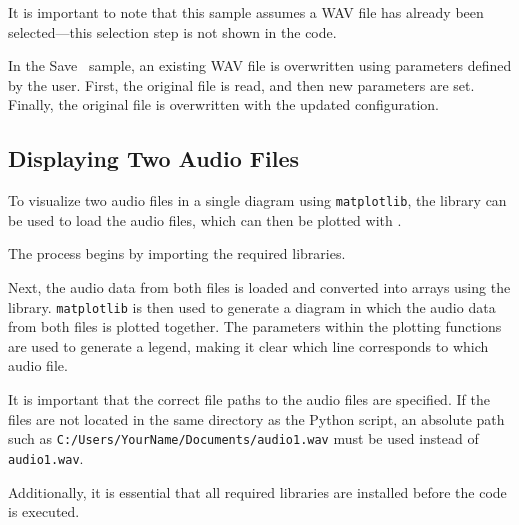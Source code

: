 It is important to note that this sample assumes a WAV file has already been selected—this selection step is not shown in the code.

\begin{code}[!htp]
	\caption{Program to read a WAV file and write its contents to a new WAV file using the wave module} 
	\label{Code:Python:File:copyWavFile}
\end{code}    

In the \glqq Save\grqq~ sample, an existing WAV file is overwritten using parameters defined by the user.  
First, the original file is read, and then new parameters are set.  
Finally, the original file is overwritten with the updated configuration.

\subsection{Displaying Two Audio Files}

To visualize two audio files in a single diagram using \texttt{matplotlib}, the  library can be used to load the audio files, which can then be plotted with .

The process begins by importing the required libraries.

Next, the audio data from both files is loaded and converted into arrays using the  library.  
\texttt{matplotlib} is then used to generate a diagram in which the audio data from both files is plotted together.  
The  parameters within the plotting functions are used to generate a legend, making it clear which line corresponds to which audio file.

It is important that the correct file paths to the audio files are specified.  
If the files are not located in the same directory as the Python script, an absolute path such as \texttt{C:/Users/YourName/Documents/audio1.wav} must be used instead of \texttt{audio1.wav}.

Additionally, it is essential that all required libraries are installed before the code is executed.

\begin{code}[!htp]
	\caption{Program to visualize and compare two audio waveforms using Matplotlib} 
	\label{Code:Python:File:plotAudioWaveforms}
\end{code}


